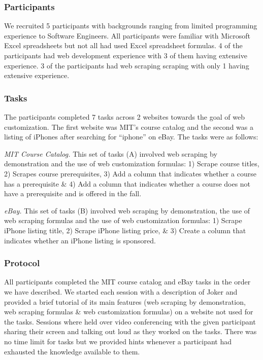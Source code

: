 \documentclass[sigconf,10pt]{acmart}
\begin{document}
\hypertarget{participants}{%
\subsubsection{Participants}\label{participants}}

We recruited 5 participants with backgrounds ranging from limited
programming experience to Software Engineers. All participants were
familiar with Microsoft Excel spreadsheets but not all had used Excel
spreadsheet formulas. 4 of the participants had web development
experience with 3 of them having extensive experience. 3 of the
participants had web scraping scraping with only 1 having extensive
experience.

\hypertarget{tasks}{%
\subsubsection{Tasks}\label{tasks}}

The participants completed 7 tasks across 2 websites towards the goal of
web customization. The first website was MIT's course catalog and the
second was a listing of iPhones after searching for ``iphone'' on eBay.
The tasks were as follows:

\emph{MIT Course Catalog.} This set of tasks (A) involved web scraping
by demonstration and the use of web customization formulas: 1) Scrape
course titles, 2) Scrapes course prerequisites, 3) Add a column that
indicates whether a course has a prerequisite \& 4) Add a column that
indicates whether a course does not have a prerequisite and is offered
in the fall.

\emph{eBay.} This set of tasks (B) involved web scraping by
demonstration, the use of web scraping formulas and the use of web
customization formulas: 1) Scrape iPhone listing title, 2) Scrape iPhone
listing price, \& 3) Create a column that indicates whether an iPhone
listing is sponsored.

\hypertarget{protocol}{%
\subsubsection{Protocol}\label{protocol}}

All participants completed the MIT course catalog and eBay tasks in the
order we have described. We started each session with a description of
Joker and provided a brief tutorial of its main features (web scraping
by demonstration, web scraping formulas \& web customization formulas)
on a website not used for the tasks. Sessions where held over video
conferencing with the given participant sharing their screen and talking
out loud as they worked on the tasks. There was no time limit for tasks
but we provided hints whenever a participant had exhausted the knowledge
available to them.
\end{document}
